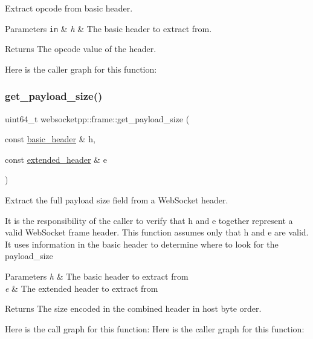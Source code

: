 Extract opcode from basic header. 


\begin{DoxyParams}[1]{Parameters}
\mbox{\tt in}  & {\em h} & The basic header to extract from. \\
\hline
\end{DoxyParams}
\begin{DoxyReturn}{Returns}
The opcode value of the header. 
\end{DoxyReturn}
Here is the caller graph for this function\+:
\mbox{\label{namespacewebsocketpp_1_1frame_a2ca0b9ba6077f201997da543d45b067f}} 
\subsubsection{\texorpdfstring{get\+\_\+payload\+\_\+size()}{get\_payload\_size()}}
{\footnotesize\ttfamily uint64\+\_\+t websocketpp\+::frame\+::get\+\_\+payload\+\_\+size (\begin{DoxyParamCaption}\item[{const \mbox{\hyperlink{structwebsocketpp_1_1frame_1_1basic__header}{basic\+\_\+header}} \&}]{h,  }\item[{const \mbox{\hyperlink{structwebsocketpp_1_1frame_1_1extended__header}{extended\+\_\+header}} \&}]{e }\end{DoxyParamCaption})\hspace{0.3cm}{\ttfamily [inline]}}



Extract the full payload size field from a Web\+Socket header. 

It is the responsibility of the caller to verify that h and e together represent a valid Web\+Socket frame header. This function assumes only that h and e are valid. It uses information in the basic header to determine where to look for the payload\+\_\+size


\begin{DoxyParams}{Parameters}
{\em h} & The basic header to extract from \\
\hline
{\em e} & The extended header to extract from\\
\hline
\end{DoxyParams}
\begin{DoxyReturn}{Returns}
The size encoded in the combined header in host byte order. 
\end{DoxyReturn}
Here is the call graph for this function\+:
Here is the caller graph for this function\+:
\mbox{\label{namespacewebsocketpp_1_1frame_a90556de9dd71c1f063153b791abeb81c}} 
